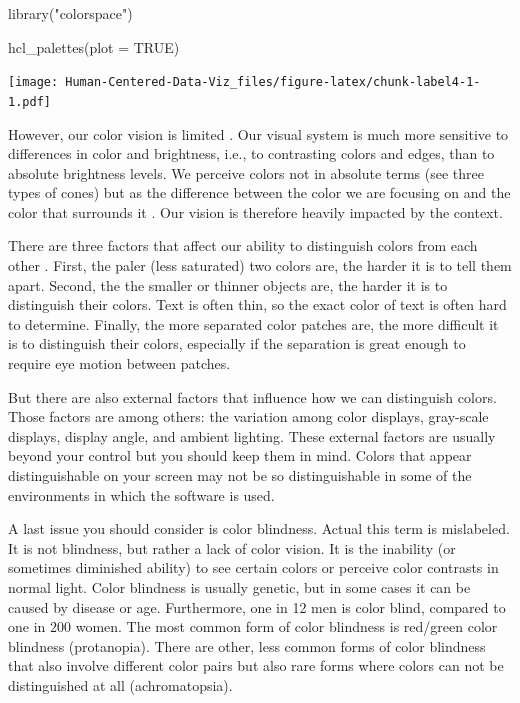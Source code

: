 \documentclass[
]{book}
\newenvironment{Shaded}{\begin{snugshade}}{\end{snugshade}}
\newcommand{\AttributeTok}[1]{\textcolor[rgb]{0.77,0.63,0.00}{#1}}
\newcommand{\ConstantTok}[1]{\textcolor[rgb]{0.00,0.00,0.00}{#1}}
\newcommand{\FunctionTok}[1]{\textcolor[rgb]{0.00,0.00,0.00}{#1}}
\newcommand{\NormalTok}[1]{#1}
\newcommand{\StringTok}[1]{\textcolor[rgb]{0.31,0.60,0.02}{#1}}
\begin{document}
\begin{Shaded}
\begin{Highlighting}[]
\FunctionTok{library}\NormalTok{(}\StringTok{"colorspace"}\NormalTok{)}

\FunctionTok{hcl\_palettes}\NormalTok{(}\AttributeTok{plot =} \ConstantTok{TRUE}\NormalTok{)}
\end{Highlighting}
\end{Shaded}

\texttt{[image: Human-Centered-Data-Viz\_files/figure-latex/chunk-label4-1-1.pdf]}

However, our color vision is limited \citep{Johnson2014designingwiththemind}. Our visual system is much more sensitive to differences in color and brightness, i.e., to contrasting colors and edges, than to absolute brightness levels. We perceive colors not in absolute terms (see three types of cones) but as the difference between the color we are focusing on and the color that surrounds it \citep{Few2009nowtoseeit}. Our vision is therefore heavily impacted by the context.

There are three factors that affect our ability to distinguish colors from each other \citep{Johnson2014designingwiththemind}. First, the paler (less saturated) two colors are, the harder it is to tell them apart. Second, the the smaller or thinner objects are, the harder it is to distinguish their colors. Text is often thin, so the exact color of text is often hard to determine. Finally, the more separated color patches are, the more difficult it is to distinguish their colors, especially if the separation is great enough to require eye motion between patches.

But there are also external factors that influence how we can distinguish colors. Those factors are among others: the variation among color displays, gray-scale displays, display angle, and ambient lighting. These external factors are usually beyond your control but you should keep them in mind. Colors that appear distinguishable on your screen may not be so distinguishable in some of the environments in which the software is used.

A last issue you should consider is color blindness. Actual this term is mislabeled. It is not blindness, but rather a lack of color vision. It is the inability (or sometimes diminished ability) to see certain colors or perceive color contrasts in normal light. Color blindness is usually genetic, but in some cases it can be caused by disease or age. Furthermore, one in 12 men is color blind, compared to one in 200 women. The most common form of color blindness is red/green color blindness (protanopia). There are other, less common forms of color blindness that also involve different color pairs but also rare forms where colors can not be distinguished at all (achromatopsia).
\end{document}
